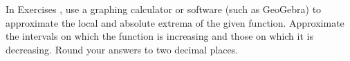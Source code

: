 {\noindent In Exercises}
{, use a graphing calculator or software (such as GeoGebra) to approximate the local and absolute extrema of the given function.  Approximate the intervals on which the function is increasing and those on which it is decreasing.  Round your answers to two decimal places.}
